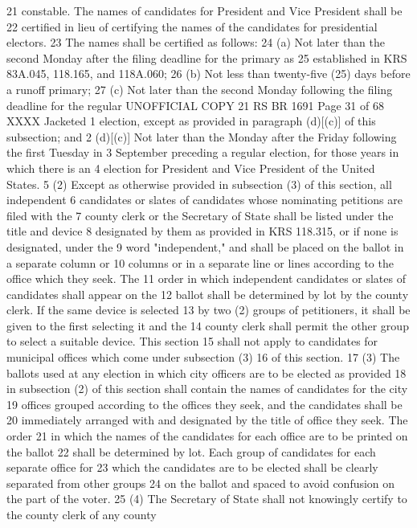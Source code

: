 21 constable. The names of candidates for President and Vice President shall be
22 certified in lieu of certifying the names of the candidates for presidential electors.
23 The names shall be certified as follows:
24 (a) Not later than the second Monday after the filing deadline for the primary as
25 established in KRS 83A.045, 118.165, and 118A.060;
26 (b) Not less than twenty-five (25) days before a runoff primary;
27 (c) Not later than the second Monday following the filing deadline for the regular 
UNOFFICIAL COPY 21 RS BR 1691
Page 31 of 68
XXXX Jacketed
1 election, except as provided in paragraph (d)[(c)] of this subsection; and
2 (d)[(c)] Not later than the Monday after the Friday following the first Tuesday in
3 September preceding a regular election, for those years in which there is an
4 election for President and Vice President of the United States.
5 (2) Except as otherwise provided in subsection (3) of this section, all independent
6 candidates or slates of candidates whose nominating petitions are filed with the
7 county clerk or the Secretary of State shall be listed under the title and device
8 designated by them as provided in KRS 118.315, or if none is designated, under the
9 word "independent," and shall be placed on the ballot in a separate column or
10 columns or in a separate line or lines according to the office which they seek. The
11 order in which independent candidates or slates of candidates shall appear on the
12 ballot shall be determined by lot by the county clerk. If the same device is selected
13 by two (2) groups of petitioners, it shall be given to the first selecting it and the
14 county clerk shall permit the other group to select a suitable device. This section
15 shall not apply to candidates for municipal offices which come under subsection (3)
16 of this section.
17 (3) The ballots used at any election in which city officers are to be elected as provided
18 in subsection (2) of this section shall contain the names of candidates for the city
19 offices grouped according to the offices they seek, and the candidates shall be
20 immediately arranged with and designated by the title of office they seek. The order
21 in which the names of the candidates for each office are to be printed on the ballot
22 shall be determined by lot. Each group of candidates for each separate office for
23 which the candidates are to be elected shall be clearly separated from other groups
24 on the ballot and spaced to avoid confusion on the part of the voter.
25 (4) The Secretary of State shall not knowingly certify to the county clerk of any county
